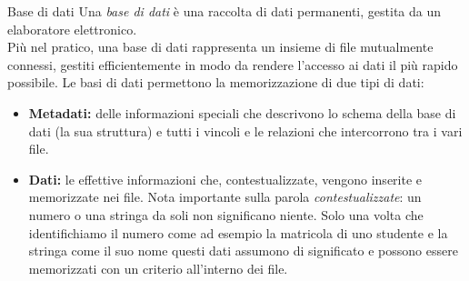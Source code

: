 \documentclass[12pt]{report}
\begin{document}
	\begin{definizione}{Base di dati}{}
		Una \textit{base di dati} è una raccolta di dati permanenti, gestita da un elaboratore elettronico.\\
		Più nel pratico, una base di dati rappresenta un insieme di file mutualmente connessi, gestiti efficientemente in modo da rendere l'accesso ai dati il più rapido possibile.
		\linebreak
		Le basi di dati permettono la memorizzazione di due tipi di dati:
		\begin{itemize}
			\item \textbf{Metadati:} delle informazioni speciali che descrivono lo schema della base di dati (la sua struttura) e tutti i vincoli e le relazioni che intercorrono tra i vari file.
			
			\item \textbf{Dati:} le effettive informazioni che, contestualizzate, vengono inserite e memorizzate nei file. Nota importante sulla parola \textit{contestualizzate}: un numero o una stringa da soli non significano niente. Solo una volta che identifichiamo il numero come ad esempio la matricola di uno studente e la stringa come il suo nome questi dati assumono di significato e possono essere memorizzati con un criterio all'interno dei file.
		\end{itemize} 
	\end{definizione}
	
\end{document}
